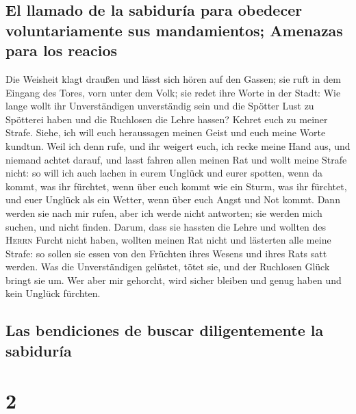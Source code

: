 \hypertarget{el-llamado-de-la-sabiduruxeda-para-obedecer-voluntariamente-sus-mandamientos-amenazas-para-los-reacios}{%
\subsection{El llamado de la sabiduría para obedecer voluntariamente sus
mandamientos; Amenazas para los
reacios}\label{el-llamado-de-la-sabiduruxeda-para-obedecer-voluntariamente-sus-mandamientos-amenazas-para-los-reacios}}

 Die Weisheit klagt draußen und lässt sich hören auf den
Gassen;  sie ruft in dem Eingang des Tores, vorn unter
dem Volk; sie redet ihre Worte in der Stadt:  Wie lange
wollt ihr Unverständigen unverständig sein und die Spötter Lust zu
Spötterei haben und die Ruchlosen die Lehre hassen? 
Kehret euch zu meiner Strafe. Siehe, ich will euch heraussagen meinen
Geist und euch meine Worte kundtun.  Weil ich denn rufe,
und ihr weigert euch, ich recke meine Hand aus, und niemand achtet
darauf,  und lasst fahren allen meinen Rat und wollt
meine Strafe nicht:  so will ich auch lachen in eurem
Unglück und eurer spotten, wenn da kommt, was ihr fürchtet,
 wenn über euch kommt wie ein Sturm, was ihr fürchtet,
und euer Unglück als ein Wetter, wenn über euch Angst und Not kommt.
 Dann werden sie nach mir rufen, aber ich werde nicht
antworten; sie werden mich suchen, und nicht finden. 
Darum, dass sie hassten die Lehre und wollten des \textsc{Herrn} Furcht
nicht haben,  wollten meinen Rat nicht und lästerten alle
meine Strafe:  so sollen sie essen von den Früchten ihres
Wesens und ihres Rats satt werden.  Was die
Unverständigen gelüstet, tötet sie, und der Ruchlosen Glück bringt sie
um.  Wer aber mir gehorcht, wird sicher bleiben und genug
haben und kein Unglück fürchten.

\hypertarget{las-bendiciones-de-buscar-diligentemente-la-sabiduruxeda}{%
\subsection{Las bendiciones de buscar diligentemente la
sabiduría}\label{las-bendiciones-de-buscar-diligentemente-la-sabiduruxeda}}

\hypertarget{section-1}{%
\section{2}\label{section-1}}


